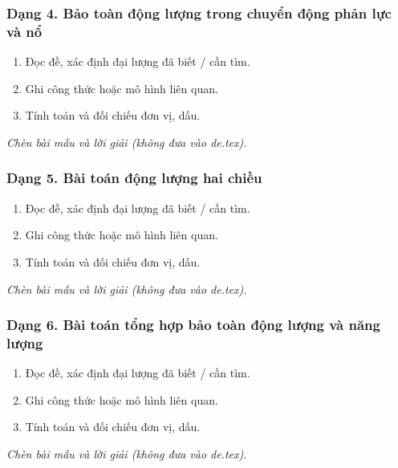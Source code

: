 \subsubsection{Dạng 4. Bảo toàn động lượng trong chuyển động phản lực và nổ}
\begin{phuongphap}
\begin{enumerate}
\item Đọc đề, xác định đại lượng đã biết / cần tìm.
\item Ghi công thức hoặc mô hình liên quan.
\item Tính toán và đối chiếu đơn vị, dấu.
\end{enumerate}
\end{phuongphap}
\begin{vidumau}
\textit{Chèn bài mẫu và lời giải (không đưa vào de.tex).}
\end{vidumau}

\subsubsection{Dạng 5. Bài toán động lượng hai chiều}
\begin{phuongphap}
\begin{enumerate}
\item Đọc đề, xác định đại lượng đã biết / cần tìm.
\item Ghi công thức hoặc mô hình liên quan.
\item Tính toán và đối chiếu đơn vị, dấu.
\end{enumerate}
\end{phuongphap}
\begin{vidumau}
\textit{Chèn bài mẫu và lời giải (không đưa vào de.tex).}
\end{vidumau}

\subsubsection{Dạng 6. Bài toán tổng hợp bảo toàn động lượng và năng lượng}
\begin{phuongphap}
\begin{enumerate}
\item Đọc đề, xác định đại lượng đã biết / cần tìm.
\item Ghi công thức hoặc mô hình liên quan.
\item Tính toán và đối chiếu đơn vị, dấu.
\end{enumerate}
\end{phuongphap}
\begin{vidumau}
\textit{Chèn bài mẫu và lời giải (không đưa vào de.tex).}
\end{vidumau}

